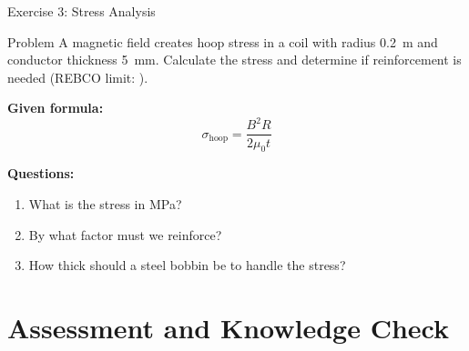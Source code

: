 \begin{frame}{Exercise 3: Stress Analysis}
    \begin{block}{Problem}
        A  magnetic field creates hoop stress in a coil with radius 0.2~m
        and conductor thickness 5~mm. Calculate the stress and determine
        if reinforcement is needed (REBCO limit: ).
    \end{block}
    
    \vspace{0.3cm}
    \textbf{Given formula:}
    \begin{equation}
        \sigma_{\text{hoop}} = \frac{B^2 R}{2 \mu_0 t}
    \end{equation}
    
    \vspace{0.3cm}
    \textbf{Questions:}
    \begin{enumerate}
        \item What is the stress in MPa?
        \item By what factor must we reinforce?
        \item How thick should a steel bobbin be to handle the stress?
    \end{enumerate}
\end{frame}

\section{Assessment and Knowledge Check}

